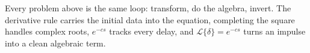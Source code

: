 \begin{conceptbox}
Every problem above is the same loop: \textcolor{accentorange}{transform, do the
algebra, invert}. The derivative rule carries the \textcolor{accentorange}{initial
data} into the equation, completing the square handles complex roots, $e^{-cs}$ tracks
every \textcolor{accentorange}{delay}, and $\mathcal{L}\{\delta\}=e^{-cs}$ turns an
impulse into a clean algebraic term.
\end{conceptbox}


